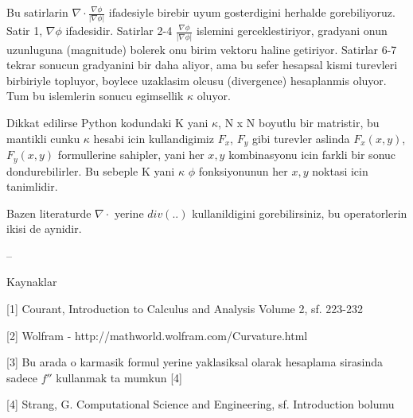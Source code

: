 \documentclass[12pt,fleqn]{article}\usepackage{../common}
\begin{document}
Bu satirlarin $\nabla \cdot \frac{\nabla \phi}{|\nabla \phi|}$ ifadesiyle
birebir uyum gosterdigini herhalde gorebiliyoruz. Satir 1, $\nabla \phi$
ifadesidir. Satirlar 2-4 $\frac{\nabla \phi}{|\nabla \phi|}$ islemini
gerceklestiriyor, gradyani onun uzunluguna (magnitude) bolerek onu birim vektoru
haline getiriyor. Satirlar 6-7 tekrar sonucun gradyanini bir daha aliyor, ama bu
sefer hesapsal kismi turevleri birbiriyle topluyor, boylece uzaklasim olcusu
(divergence) hesaplanmis oluyor. Tum bu islemlerin sonucu egimsellik $\kappa$
oluyor.

Dikkat edilirse Python kodundaki K yani $\kappa$, N x N boyutlu bir matristir,
bu mantikli cunku $\kappa$ hesabi icin kullandigimiz $F_x$, $F_y$ gibi
turevler aslinda $F_x(x,y)$, $F_y(x,y)$ formullerine sahipler, yani her $x,y$
kombinasyonu icin farkli bir sonuc dondurebilirler. Bu sebeple K yani $\kappa$
$\phi$ fonksiyonunun her $x,y$ noktasi icin tanimlidir. 

Bazen literaturde $\nabla \cdot$ yerine $div(..)$ kullanildigini gorebilirsiniz,
bu operatorlerin ikisi de aynidir.

--

Kaynaklar

[1] Courant, Introduction to Calculus and Analysis Volume 2, sf. 223-232

[2] Wolfram - http://mathworld.wolfram.com/Curvature.html

[3] Bu arada o karmasik formul yerine yaklasiksal olarak hesaplama
sirasinda sadece $f''$ kullanmak ta mumkun [4]

[4] Strang, G. Computational Science and Engineering, sf. Introduction bolumu
\end{document}
